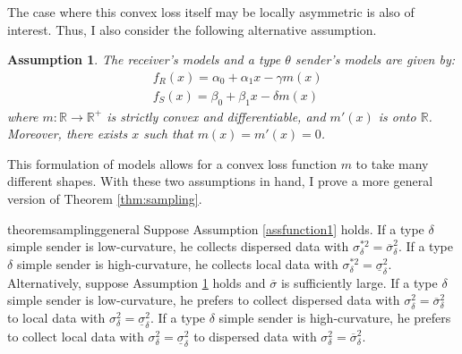 \documentclass[11pt,dvipsnames]{article}
\newtheorem{assumption}{Assumption}
\begin{document}
\begin{appendix}
The case where this convex loss itself may be locally asymmetric is also of interest.
Thus, I also consider the following alternative assumption.
\begin{assumption}
The receiver's models and a type $\theta$ sender's models are given by:
\begin{align}
&f_R(x) = \alpha_0+\alpha_1 x-\gamma m(x)
\label{eq:generalfunctionrec2}	
\\
&f_S(x) = \beta_0+\beta_1x-\delta m(x)
\label{eq:generalfunctionsend2}	
\end{align}
where $m: \mathbb{R} \to \mathbb{R}^+$ is strictly convex and differentiable, and $m'(x)$ is onto $\mathbb{R}$. Moreover, there exists $x$ such that $m(x) = m'(x) = 0$.
\label{assfunction2}	
\end{assumption}
This formulation of models allows for a convex loss function $m$ to take many different shapes.
With these two assumptions in hand, I prove a more general version of Theorem \ref{thm:sampling}.
\begin{restatable}{theorem}{samplinggeneral}
Suppose Assumption \ref{assfunction1} holds.
If a type $\delta$ simple sender is low-curvature, he collects dispersed data with $\sigma_\delta^{*2}=\overline{\sigma}_\delta^2$.
If a type $\delta$ simple sender is high-curvature, he collects local data with $\sigma_\delta^{*2}=\underline{\sigma}_\delta^2$.
\\
Alternatively, suppose Assumption \ref{assfunction2} holds and $\overline{\sigma}$ is sufficiently large.
If a type $\delta$ simple sender is low-curvature, he prefers to collect dispersed data with $\sigma_\delta^{2}=\overline{\sigma}_\delta^2$ to local data with $\sigma_\delta^{2}=\underline{\sigma}_\delta^2$.
If a type $\delta$ simple sender is high-curvature, he prefers to collect local data with $\sigma_\delta^{2}=\underline{\sigma}_\delta^2$ to dispersed data with $\sigma_\delta^{2}=\overline{\sigma}_\delta^2$.
\label{thm:samplinggeneral}
\end{restatable}


\end{appendix}
\end{document}
